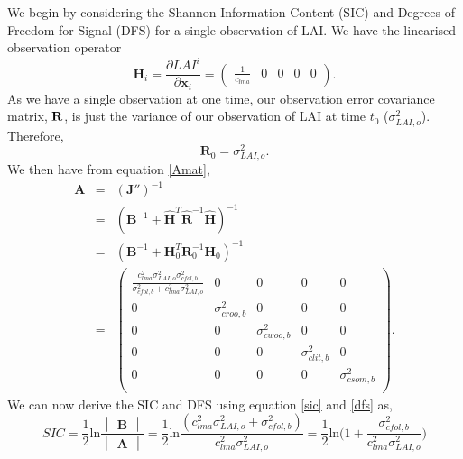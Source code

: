 \documentclass[11pt]{article}
\begin{document}
We begin by considering the Shannon Information Content (SIC) and Degrees of Freedom for Signal (DFS) for a single observation of LAI. We have the linearised observation operator
\begin{equation}
\textbf{H}_{i} = \frac{\partial LAI^{i}}{\partial \textbf{x}_{i}} =
\begin{pmatrix}
\frac{1}{c_{lma}} & 0 & 0 & 0 & 0
\end{pmatrix}.
\end{equation}
As we have a single observation at one time, our observation error covariance matrix, $\bf{R}$, is just the variance of our observation of LAI at time $t_0$ ($\sigma_{LAI,o}^{2}$). Therefore,
\begin{equation}
\mathbf{R}_0=\sigma_{LAI,o}^{2}.
\end{equation}
We then have from equation \ref{Amat},
\begin{equation}
\begin{array} {lcl}
\mathbf{A} &=& (\mathbf{J}'')^{-1} \\
&=& (\mathbf{B}^{-1}+\hat{\mathbf{H}}^{T}\hat{\mathbf{R}}^{-1}\hat{\mathbf{H}})^{-1} \\
&=& (\mathbf{B}^{-1}+\mathbf{H}_0^{T}\mathbf{R}_0^{-1}\mathbf{H}_0)^{-1} \\
&=& \begin{pmatrix} 
\frac{c_{lma}^2 \sigma_{LAI,o}^2 \sigma_{cfol,b}^2}{\sigma_{cfol,b}^2 + c_{lma}^2 \sigma_{LAI,o}^2} & 0 & 0 & 0 & 0 \\
0 & \sigma_{croo,b}^{2} & 0 & 0 & 0 \\
0 & 0 & \sigma_{cwoo,b}^{2} & 0 & 0 \\
0 & 0 & 0 & \sigma_{clit,b}^{2} & 0 \\
0 & 0 & 0 & 0 & \sigma_{csom,b}^{2} \\
\end{pmatrix}.
\end{array}
\end{equation} 
We can now derive the SIC and DFS using equation \ref{sic} and \ref{dfs} as,
\begin{equation}
SIC = \frac{1}{2}\text{ln}\frac{\begin{vmatrix} \mathbf{B} \end{vmatrix}}{\begin{vmatrix} \mathbf{A} \end{vmatrix}}= \frac{1}{2}\text{ln}\frac{(c_{lma}^2 \sigma_{LAI,o}^{2}+\sigma_{cfol,b}^{2})}{c_{lma}^2 \sigma_{LAI,o}^{2}}
=\frac{1}{2}\text{ln} \bigg(1+\frac{\sigma_{cfol,b}^{2}}{c_{lma}^2 \sigma_{LAI,o}^{2}}\bigg) \label{eqn:siclai}
\end{equation}
\end{document}
